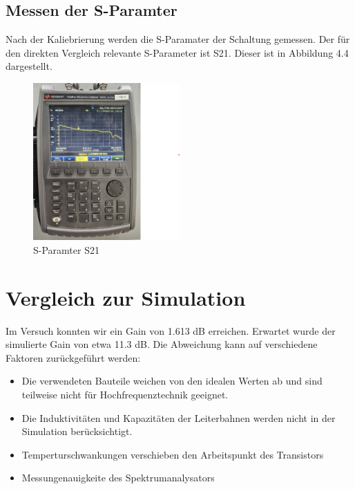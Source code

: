 \subsection{Messen der S-Paramter}
Nach der Kaliebrierung werden die S-Paramater der Schaltung gemessen. Der für den direkten Vergleich relevante S-Parameter ist S21. Dieser
ist in Abbildung 4.4 dargestellt.
\begin{figure}[h]
    \centering
    \includegraphics[width=0.5\textwidth]{Pictures/SParameterrichtig.png}
    \caption{S-Paramter S21}
\end{figure}
\clearpage




\section{Vergleich zur Simulation}
Im Versuch konnten wir ein Gain von 1.613 dB erreichen. Erwartet wurde der simulierte Gain von etwa 11.3 dB.
Die Abweichung kann auf verschiedene Faktoren zurückgeführt werden:
\begin{itemize}
    \item Die verwendeten Bauteile weichen von den idealen Werten ab und sind teilweise nicht für Hochfrequenztechnik geeignet.
    \item Die Induktivitäten und Kapazitäten der Leiterbahnen werden nicht in der Simulation berücksichtigt.
    \item Temperturschwankungen verschieben den Arbeitspunkt des Transistors
    \item Messungenauigkeite des Spektrumanalysators 
\end{itemize}

\clearpage
